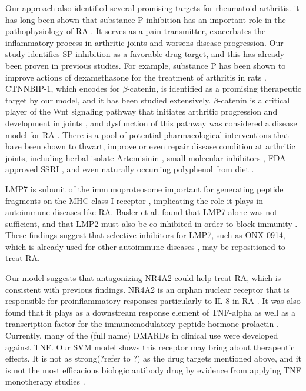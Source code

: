     Our approach also identified several promising targets for rheumatoid arthritis. it has long been shown that substance P inhibition has an important role in the pathophysiology of RA \cite{lisowska2015substance,garrett1992role,green2005gastrin,keeble2004role,lotz1987substance,okamura2017dual,lam1990mediators,lam1991neurogenic}. It serves as a pain transmitter, exacerbates the inflammatory process in arthritic joints and worsens disease progression. Our study identifies SP inhibition as a favorable drug target, and this has already been proven in previous studies. For example, substance P has been shown to improve actions of dexamethasone for the treatment of arthritis in rats \cite{lam2010substance}. CTNNBIP-1, which encodes for $\beta$-catenin, is identified as a promising therapeutic target by our model, and it has been studied extensively. $\beta$-catenin is a critical player of the Wnt signaling pathway that initiates arthritic progression and development in joints \cite{sen2005wnt,zhou2017wnt}, and dysfunction of this pathway was considered a disease model for RA \cite{wu2010beta,zhou2017wnt}. There is a pool of potential pharmacological interventions that have been shown to thwart, improve or even repair disease condition at arthritic joints, including herbal isolate Artemisinin \cite{zhong2018artemisinin}, small molecular inhibitors \cite{lietman2018inhibition,landman2013small,landman2013small,dell2017pharmacological}, FDA approved SSRI \cite{miyamoto2017fluoxetine}, and even naturally occurring polyphenol from diet \cite{li2018resveratrol}. 
    
    LMP7 is subunit of the immunoproteosome important for generating peptide fragments on the MHC class I receptor \cite{joeris2012proteasome}, implicating the role it plays in autoimmune diseases like RA. Basler et al. found that LMP7 alone was not sufficient, and that LMP2 must also be co-inhibited in order to block immunity \cite{basler2018co}. These findings suggest that selective inhibitors for LMP7, such as ONX 0914, which is already used for other autoimmune diseases \cite{althof2018immunoproteasome,liu2017onx,verbrugge2012targeting}, may be repositioned to treat RA.
    
    Our model suggests that antagonizing NR4A2 could help treat RA, which is consistent with previous findings. NR4A2 is an orphan nuclear receptor that is responsible for proinflammatory responses particularly to IL-8 in RA \cite{aherne2009identification}. It was also found that it plays as a downstream response element of TNF-alpha \cite{mix2012orphan} as well as a transcription factor for the immunomodulatory peptide hormone prolactin \cite{mccoy2015orphan}. Currently, many of the (full name) DMARDs in clinical use were developed against TNF. Our SVM model shows this receptor may bring about therapeutic effects. It is not as strong(?refer to ?) as the drug targets mentioned above, and it is not the most efficacious biologic antibody drug by evidence from applying TNF monotherapy studies\cite{aletaha2018diagnosis} .
  
